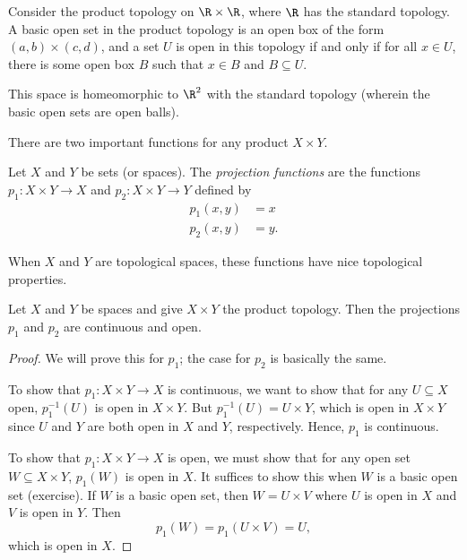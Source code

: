 \documentclass[noname]{notes}
\begin{document}
\begin{example}
	Consider the product topology on $\R \times \R$, where $\R$ has the standard topology. A basic open set in the product topology is an open box of the form $(a,b) \times (c,d)$, and a set $U$ is open in this topology if and only if for all $x \in U$, there is some open box $B$ such that $x \in B$ and $B \subseteq U$. 
	
	This space is homeomorphic to $\R^2$ with the standard topology (wherein the basic open sets are open balls). 
\end{example}

There are two important functions for any product $X \times Y$. 

\begin{definition}
	Let $X$ and $Y$ be sets (or spaces). The \emph{projection functions} are the functions $p_1 \colon X \times Y \to X$ and $p_2 \colon X \times Y \to Y$ defined by 
	\begin{align*}
		p_1(x,y) &= x	\\
		p_2(x,y) &= y. 
	\end{align*}
\end{definition}

When $X$ and $Y$ are topological spaces, these functions have nice topological properties. 

\begin{proposition}
	Let $X$ and $Y$ be spaces and give $X \times Y$ the product topology. Then the projections $p_1$ and $p_2$ are continuous and open. 
\end{proposition}

\begin{proof}
	We will prove this for $p_1$; the case for $p_2$ is basically the same. 
	
	To show that $p_1 \colon X \times Y \to X$ is continuous, we want to show that for any $U \subseteq X$ open, $p_1^{-1}(U)$ is open in $X \times Y$. But $p_1^{-1}(U) = U \times Y$, which is open in $X \times Y$ since $U$ and $Y$ are both open in $X$ and $Y$, respectively. Hence, $p_1$ is continuous. 
	
	To show that $p_1 \colon X \times Y \to X$ is open, we must show that for any open set $W \subseteq X \times Y$, $p_1(W)$ is open in $X$. It suffices to show this when $W$ is a basic open set (exercise). If $W$ is a basic open set, then $W = U \times V$ where $U$ is open in $X$ and $V$ is open in $Y$. Then 
	\[
		p_1(W) = p_1(U \times V) = U, 
	\]
	which is open in $X$. 
\end{proof}
\end{document}
